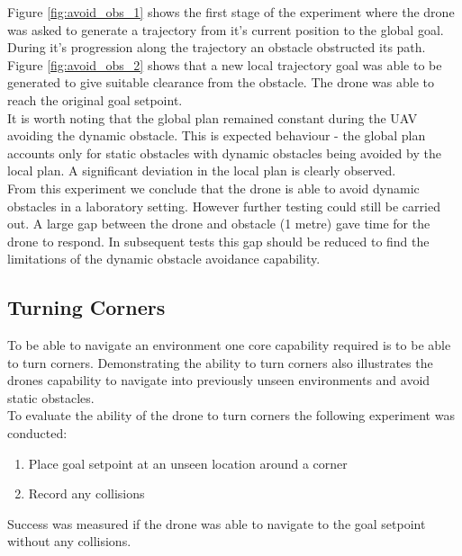 \documentclass[capstone_report.tex]{subfiles}
\begin{document}
Figure \ref{fig:avoid_obs_1} shows the first stage of the experiment where the drone was asked to generate a trajectory from it's current position to the global goal.  During it's progression along the trajectory an obstacle obstructed its path.   Figure \ref{fig:avoid_obs_2} shows that a new local trajectory goal was able to be generated to give suitable clearance from the obstacle.  The drone was able to reach the original goal setpoint.\\

It is worth noting that the global plan remained constant during the UAV avoiding the dynamic obstacle. This is expected behaviour - the global plan accounts only for static obstacles with dynamic obstacles being avoided by the local plan. A significant deviation in the local plan is clearly observed.\\

From this experiment we conclude that the drone is able to avoid dynamic obstacles in a laboratory setting.  However further testing could still be carried out.  A large gap between the drone and obstacle (1 metre) gave time for the drone to respond.  In subsequent tests this gap should be reduced to find the limitations of the dynamic obstacle avoidance capability.

\subsection{Turning Corners}
To be able to navigate an environment one core capability required is to be able to turn corners.  Demonstrating the ability to turn corners also illustrates the drones capability to navigate into previously unseen environments and avoid static obstacles.\\

To evaluate the ability of the drone to turn corners the following experiment was conducted:
\begin{enumerate}
    \item Place goal setpoint at an unseen location around a corner
    \item Record any collisions 
\end{enumerate}
Success was measured if the drone was able to navigate to the goal setpoint without any collisions.
\end{document}
